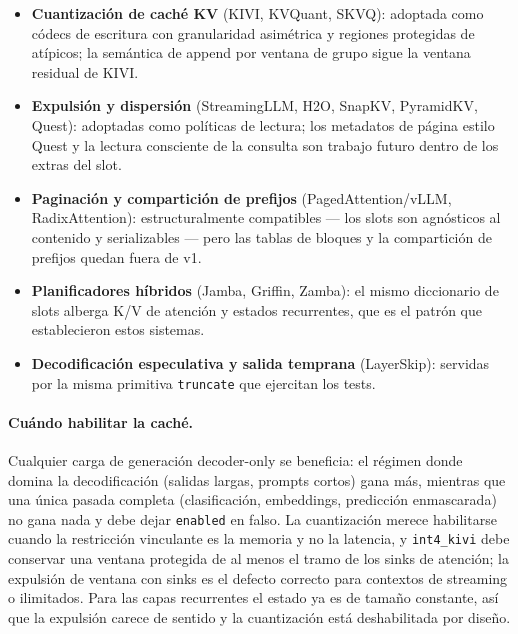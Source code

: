 \begin{itemize}[leftmargin=*]
    \item \textbf{Cuantización de caché KV} (KIVI, KVQuant, SKVQ): adoptada como códecs de escritura con granularidad asimétrica y regiones protegidas de atípicos; la semántica de append por ventana de grupo sigue la ventana residual de KIVI.
    \item \textbf{Expulsión y dispersión} (StreamingLLM, H2O, SnapKV, PyramidKV, Quest): adoptadas como políticas de lectura; los metadatos de página estilo Quest y la lectura consciente de la consulta son trabajo futuro dentro de los extras del slot.
    \item \textbf{Paginación y compartición de prefijos} (PagedAttention/vLLM, RadixAttention): estructuralmente compatibles --- los slots son agnósticos al contenido y serializables --- pero las tablas de bloques y la compartición de prefijos quedan fuera de v1.
    \item \textbf{Planificadores híbridos} (Jamba, Griffin, Zamba): el mismo diccionario de slots alberga K/V de atención y estados recurrentes, que es el patrón que establecieron estos sistemas.
    \item \textbf{Decodificación especulativa y salida temprana} (LayerSkip): servidas por la misma primitiva \texttt{truncate} que ejercitan los tests.
\end{itemize}

\paragraph{Cuándo habilitar la caché.} Cualquier carga de generación decoder-only se beneficia: el régimen donde domina la decodificación (salidas largas, prompts cortos) gana más, mientras que una única pasada completa (clasificación, embeddings, predicción enmascarada) no gana nada y debe dejar \texttt{enabled} en falso. La cuantización merece habilitarse cuando la restricción vinculante es la memoria y no la latencia, y \texttt{int4\_kivi} debe conservar una ventana protegida de al menos el tramo de los sinks de atención; la expulsión de ventana con sinks es el defecto correcto para contextos de streaming o ilimitados. Para las capas recurrentes el estado ya es de tamaño constante, así que la expulsión carece de sentido y la cuantización está deshabilitada por diseño.
